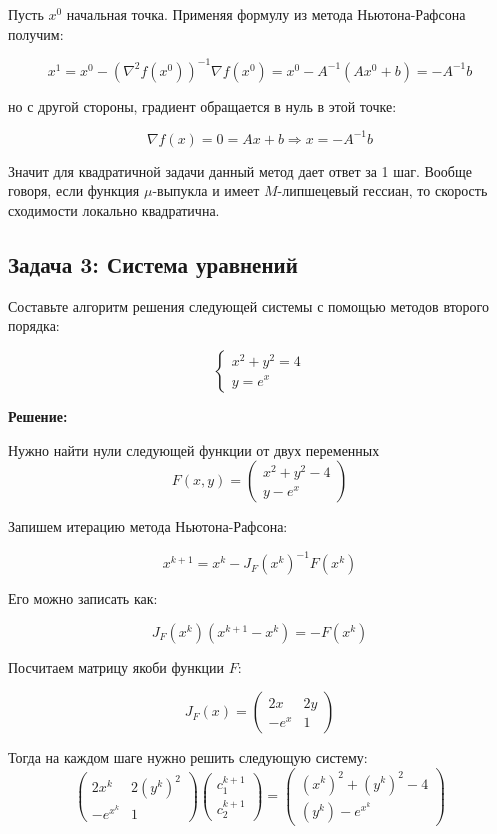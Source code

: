 {Пусть \( x^{0} \) начальная точка. Применяя формулу из метода Ньютона-Рафсона получим:

\[
x^{1} = x^{0} - \left(\nabla^{2} f(x^{0})\right)^{-1}\nabla f(x^{0}) = x^{0} - A^{-1}\left(Ax^{0} + b\right) = -A^{-1}b
\]

но с другой стороны, градиент обращается в нуль в этой точке:

\[
\nabla f(x) = 0 = Ax + b \Rightarrow x = -A^{-1}b
\]


Значит для квадратичной задачи данный метод дает ответ за 1 шаг. Вообще говоря, если функция $\mu$-выпукла и имеет $M$-липшецевый гессиан, то скорость сходимости локально квадратична.

\subsection*{Задача 3: Система уравнений}

Составьте алгоритм решения следующей системы с помощью методов второго порядка:

\[
\begin{cases}
x^{2} + y^{2} = 4\\
y = e^{x}
\end{cases}
\]

\textbf{Решение:}

Нужно найти нули следующей функции от двух переменных
\[
F(x, y) = 
\begin{pmatrix}
x^{2} + y^{2} - 4 \\
y - e^x
\end{pmatrix}
\]

Запишем итерацию метода Ньютона-Рафсона:

\[
x^{k + 1} = x^{k} - J_{F}(x^{k})^{-1}F(x^{k})
\]

Его можно записать как:

\[
J_{F}(x^{k})(x^{k + 1} - x^{k}) = -F(x^{k})
\]

Посчитаем матрицу якоби функции $F$:

\[
J_{F}(x) = 
\begin{pmatrix}
2x   & 2y \\
-e^x & 1
\end{pmatrix}
\]

Тогда на каждом шаге нужно решить следующую систему:
\[
\begin{pmatrix}
    2x^{k} & 2(y^{k})^{2} \\
    -e^{x^{k}} & 1 
\end{pmatrix}
\begin{pmatrix}
    c_{1}^{k + 1}  \\
    c_{2}^{k + 1}
\end{pmatrix} 
=
\begin{pmatrix}
    (x^{k})^2 + (y^{k})^2 - 4\\
    (y^{k}) - e^{x^{k}}
\end{pmatrix} 
\]

}
